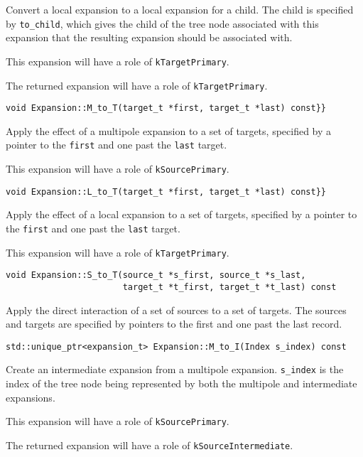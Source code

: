 Convert a local expansion to a local expansion for a child. The child is
specified by \texttt{to\_child}, which gives the child of the tree node
associated with this expansion that the resulting expansion should be
associated with.

This expansion will have a role of \texttt{kTargetPrimary}.

The returned expansion will have a role of \texttt{kTargetPrimary}.

\begin{lstlisting}
void Expansion::M_to_T(target_t *first, target_t *last) const}}
\end{lstlisting}

Apply the effect of a multipole expansion to a set of targets, specified by
a pointer to the \texttt{first} and one past the \texttt{last} target.

This expansion will have a role of \texttt{kSourcePrimary}.

\begin{lstlisting}
void Expansion::L_to_T(target_t *first, target_t *last) const}}
\end{lstlisting}

Apply the effect of a local expansion to a set of targets, specified by
a pointer to the \texttt{first} and one past the \texttt{last} target.

This expansion will have a role of \texttt{kTargetPrimary}.

\begin{lstlisting}
void Expansion::S_to_T(source_t *s_first, source_t *s_last, 
                       target_t *t_first, target_t *t_last) const
\end{lstlisting}

Apply the direct interaction of a set of sources to a set of targets. The
sources and targets are specified by pointers to the first and one past the
last record.

\begin{lstlisting}
std::unique_ptr<expansion_t> Expansion::M_to_I(Index s_index) const
\end{lstlisting}


Create an intermediate expansion from a multipole expansion. \texttt{s\_index}
is the index of the tree node being represented by both the multipole and
intermediate expansions.

This expansion will have a role of \texttt{kSourcePrimary}.

The returned expansion will have a role of \texttt{kSourceIntermediate}.

